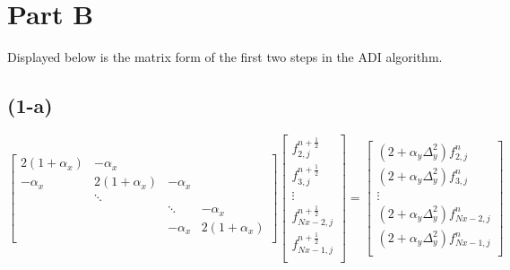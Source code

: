 \documentclass[12pt]{article}
\begin{document}
		
	\section{Part B}
		
	\noindent Displayed below is the matrix form of the first two steps in the ADI algorithm.
	\subsection{(1-a)}	
	\[
	\begin{bmatrix} 
	2(1+\alpha_x) & -\alpha_x   &			   &\\
	-\alpha_x & 2(1+\alpha_x) & -\alpha_x  &\\
			  & \ddots &			   &\\
	&	 	  & \ddots & -\alpha_x  \\
	&		  & -\alpha_x & 2(1+\alpha_x)  \\ 
	\end{bmatrix}
	\begin{bmatrix} 
	f_{2,j}^{n+\frac{1}{2}}\\
	f_{3,j}^{n+\frac{1}{2}}\\
	\vdots\\
	f_{Nx-2,j}^{n+\frac{1}{2}}\\
	f_{Nx-1,j}^{n+\frac{1}{2}}\\ 
	\end{bmatrix} = 
	\begin{bmatrix} 
		(2 + \alpha_y\Delta_y^2)f_{2,j}^{n}\\
		(2 + \alpha_y\Delta_y^2)f_{3,j}^{n}\\
		\vdots\\
		(2 + \alpha_y\Delta_y^2)f_{Nx-2,j}^{n}\\
		(2 + \alpha_y\Delta_y^2)f_{Nx-1,j}^{n}\\ 
		\end{bmatrix}
	\]
\end{document}
